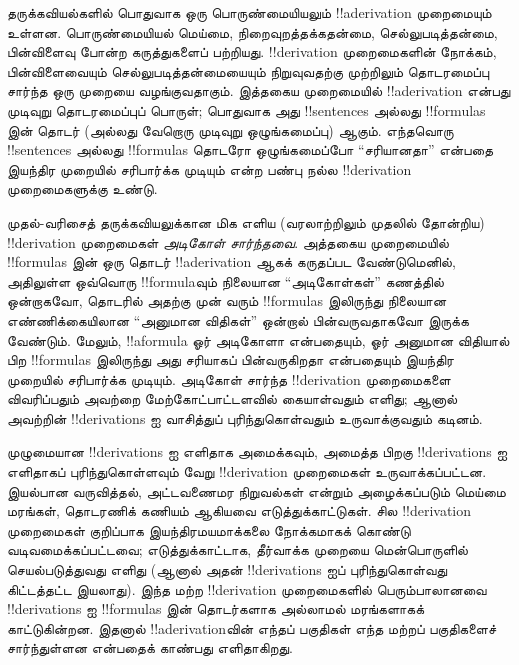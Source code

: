\documentclass[../../../include/open-logic-section]{subfiles}
\begin{document}
      {}
      {}


தருக்கவியல்களில் பொதுவாக ஒரு பொருண்மையியலும் !!a{derivation}
முறைமையும் உள்ளன. பொருண்மையியல் மெய்மை, நிறைவுறத்தக்கதன்மை,
செல்லுபடித்தன்மை, பின்விளைவு போன்ற கருத்துகளைப் பற்றியது.
!!{derivation} முறைமைகளின் நோக்கம், பின்விளைவையும் செல்லுபடித்தன்மையையும்
நிறுவுவதற்கு முற்றிலும் தொடரமைப்பு சார்ந்த ஒரு முறையை வழங்குவதாகும்.
இத்தகைய முறைமையில் !!a{derivation} என்பது முடிவுறு தொடரமைப்புப் பொருள்;
பொதுவாக அது !!{sentence}s அல்லது !!{formula}s இன் தொடர் (அல்லது வேறொரு
முடிவுறு ஒழுங்கமைப்பு) ஆகும். எந்தவொரு !!{sentence}s அல்லது
!!{formula}s தொடரோ ஒழுங்கமைப்போ ``சரியானதா'' என்பதை இயந்திர முறையில்
சரிபார்க்க முடியும் என்ற பண்பு நல்ல !!{derivation} முறைமைகளுக்கு உண்டு.

முதல்-வரிசைத் தருக்கவியலுக்கான மிக எளிய (வரலாற்றிலும் முதலில் தோன்றிய)
!!{derivation} முறைமைகள் \emph{அடிகோள் சார்ந்தவை}. அத்தகைய முறைமையில்
!!{formula}s இன் ஒரு தொடர் !!a{derivation} ஆகக் கருதப்பட வேண்டுமெனில்,
அதிலுள்ள ஒவ்வொரு !!{formula}வும் நிலையான ``அடிகோள்கள்'' கணத்தில்
ஒன்றாகவோ, தொடரில் அதற்கு முன் வரும் !!{formula}s இலிருந்து நிலையான
எண்ணிக்கையிலான ``அனுமான விதிகள்'' ஒன்றால் பின்வருவதாகவோ இருக்க வேண்டும்.
மேலும், !!a{formula} ஓர் அடிகோளா என்பதையும், ஓர் அனுமான விதியால் பிற
!!{formula}s இலிருந்து அது சரியாகப் பின்வருகிறதா என்பதையும் இயந்திர
முறையில் சரிபார்க்க முடியும். அடிகோள் சார்ந்த !!{derivation} முறைமைகளை
விவரிப்பதும் அவற்றை மேற்கோட்பாட்டளவில் கையாள்வதும் எளிது; ஆனால் அவற்றின்
!!{derivation}s ஐ வாசித்துப் புரிந்துகொள்வதும் உருவாக்குவதும் கடினம்.

முழுமையான !!{derivation}s ஐ எளிதாக அமைக்கவும், அமைத்த பிறகு
!!{derivation}s ஐ எளிதாகப் புரிந்துகொள்ளவும் வேறு !!{derivation} முறைமைகள்
உருவாக்கப்பட்டன.
இயல்பான வருவித்தல், அட்டவணைமர நிறுவல்கள் என்றும் அழைக்கப்படும் மெய்மை
மரங்கள், தொடரணிக் கணியம் ஆகியவை எடுத்துக்காட்டுகள். சில !!{derivation}
முறைமைகள் குறிப்பாக இயந்திரமயமாக்கலை நோக்கமாகக் கொண்டு வடிவமைக்கப்பட்டவை;
எடுத்துக்காட்டாக, தீர்வாக்க முறையை மென்பொருளில் செயல்படுத்துவது எளிது
(ஆனால் அதன் !!{derivation}s ஐப் புரிந்துகொள்வது கிட்டத்தட்ட இயலாது).
இந்த மற்ற !!{derivation} முறைமைகளில் பெரும்பாலானவை !!{derivation}s ஐ
!!{formula}s இன் தொடர்களாக அல்லாமல் மரங்களாகக் காட்டுகின்றன. இதனால்
!!a{derivation}வின் எந்தப் பகுதிகள் எந்த மற்றப் பகுதிகளைச் சார்ந்துள்ளன
என்பதைக் காண்பது எளிதாகிறது.
\end{document}
